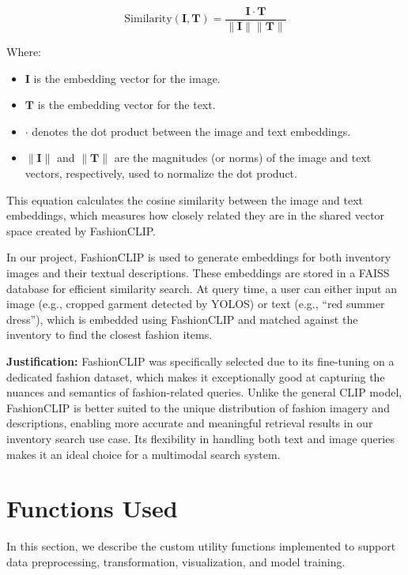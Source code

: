   \[
  \text{Similarity}(\mathbf{I}, \mathbf{T}) = \frac{\mathbf{I} \cdot \mathbf{T}}{\|\mathbf{I}\| \|\mathbf{T}\|}
  \]

  Where:

  \begin{itemize}
    \setlength\itemsep{-1.5em}
      \item $\mathbf{I}$ is the embedding vector for the image.
      \item $\mathbf{T}$ is the embedding vector for the text.
      \item $\cdot$ denotes the dot product between the image and text embeddings.
      \item $\|\mathbf{I}\|$ and $\|\mathbf{T}\|$ are the magnitudes (or norms) of the image and text vectors, respectively, used to normalize the dot product.
  \end{itemize}

  This equation calculates the cosine similarity between the image and text embeddings, which measures how closely related they are in the shared vector space created by FashionCLIP.

In our project, FashionCLIP is used to generate embeddings for both inventory images and their textual descriptions. These embeddings are stored in a FAISS database for efficient similarity search. At query time, a user can either input an image (e.g., cropped garment detected by YOLOS) or text (e.g., ``red summer dress''), which is embedded using FashionCLIP and matched against the inventory to find the closest fashion items.

\textbf{Justification:} FashionCLIP was specifically selected due to its fine-tuning on a dedicated fashion dataset, which makes it exceptionally good at capturing the nuances and semantics of fashion-related queries. Unlike the general CLIP model, FashionCLIP is better suited to the unique distribution of fashion imagery and descriptions, enabling more accurate and meaningful retrieval results in our inventory search use case. Its flexibility in handling both text and image queries makes it an ideal choice for a multimodal search system.

\section{Functions Used}

In this section, we describe the custom utility functions implemented to support data preprocessing, transformation, visualization, and model training.

